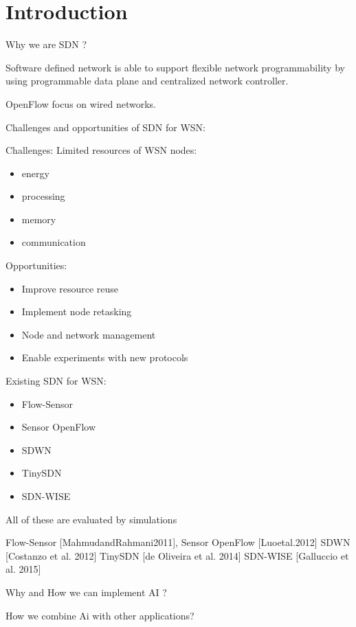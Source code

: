\section{Introduction}

Why we are SDN ?

Software defined network is able to support flexible network programmability 
by using programmable data plane and centralized network controller.

OpenFlow focus on wired networks.

Challenges and opportunities of SDN for WSN:

Challenges: Limited resources of WSN nodes:
\begin{itemize}
\item	energy
\item	processing
\item	memory
\item	communication
\end{itemize}

Opportunities: 
\begin{itemize}
\item	Improve resource reuse
\item	Implement node retasking 
\item	Node and network management
\item	Enable experiments with new protocols
\end{itemize}

Existing SDN for WSN:
\begin{itemize}
\item	Flow-Sensor
\item	Sensor OpenFlow
\item	SDWN
\item	TinySDN
\item	SDN-WISE
\end{itemize}
All of these are evaluated by simulations




Flow-Sensor [MahmudandRahmani2011], 
Sensor OpenFlow [Luoetal.2012] 
SDWN [Costanzo et al. 2012]
TinySDN [de Oliveira et al. 2014]
SDN-WISE [Galluccio et al. 2015]

Why and How we can implement AI ?

How we combine Ai with other applications?
